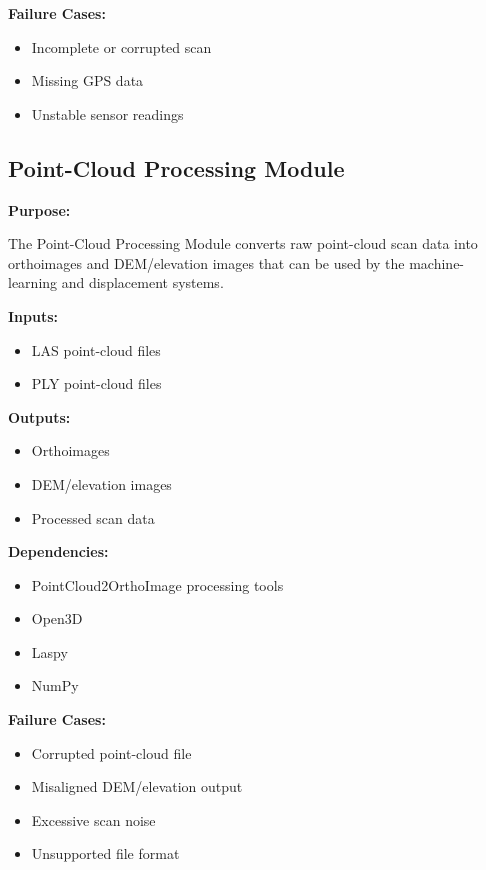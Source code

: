 \documentclass{article}
\begin{document}
\textbf{Failure Cases:}

\begin{itemize}
    \item Incomplete or corrupted scan
    \item Missing GPS data
    \item Unstable sensor readings
\end{itemize}

\subsection{Point-Cloud Processing Module}

\textbf{Purpose:}

The Point-Cloud Processing Module converts raw point-cloud scan data into orthoimages and DEM/elevation images that can be used by the machine-learning and displacement systems.

\textbf{Inputs:}

\begin{itemize}
    \item LAS point-cloud files
    \item PLY point-cloud files
\end{itemize}

\textbf{Outputs:}

\begin{itemize}
    \item Orthoimages
    \item DEM/elevation images
    \item Processed scan data
\end{itemize}

\textbf{Dependencies:}

\begin{itemize}
    \item PointCloud2OrthoImage processing tools
    \item Open3D
    \item Laspy
    \item NumPy
\end{itemize}

\textbf{Failure Cases:}

\begin{itemize}
    \item Corrupted point-cloud file
    \item Misaligned DEM/elevation output
    \item Excessive scan noise
    \item Unsupported file format
\end{itemize}
\end{document}
